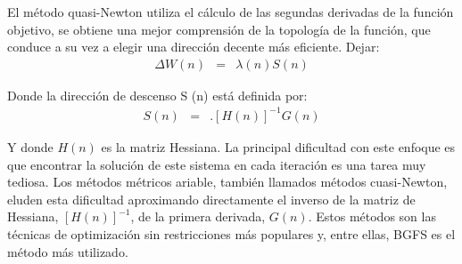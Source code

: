 

El método quasi-Newton utiliza el cálculo de las segundas derivadas de la función objetivo, se obtiene una mejor comprensión de la topología de la función, que conduce a su vez a elegir una dirección decente más eficiente. Dejar:
\begin{eqnarray}
	\Delta W(n) &=& \lambda(n)S(n)
\end{eqnarray}

Donde la dirección de descenso S (n) está definida por:
\begin{eqnarray}
	S(n) &=& .[H(n)]^{-1}G(n)
\end{eqnarray}

Y donde $H(n)$ es la matriz Hessiana. La principal dificultad con este enfoque es que encontrar la solución de este sistema en cada iteración es una tarea muy tediosa. Los métodos métricos ariable, también llamados métodos cuasi-Newton, eluden esta dificultad aproximando directamente el inverso de la matriz de Hessiana, $[H(n)]^{-1}$, de la primera derivada, $G(n)$. Estos métodos son las técnicas de optimización sin restricciones más populares y, entre ellas, BGFS es el método más utilizado.%




